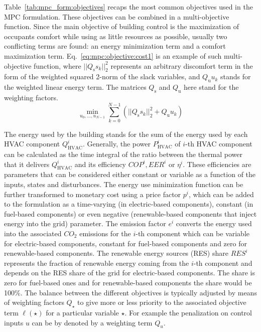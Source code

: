 \documentclass[10pt]{extarticle}
\begin{document}
Table~\ref{tab:mpc_form:objectives} recaps the most common objectives used 
in the MPC formulation. These objectives can be combined in a multi-objective function. 
% 
Since the main objective of building control is the maximization of occupants comfort while using as little resources as possible,
usually two conflicting terms are found: an energy minimization term
and a comfort maximization term.  
% 
Eq.~\eqref{eq:mpc:objective:cost1} is an example of such
 multi-objective function,
where $||{Q_{\text{s}} s_{k}}||_2^2$ represents an arbitrary discomfort term in the form of the weighted squared 2-norm of the slack variables, and ${Q_{\text{u}} u_{k}}$ stands for the weighted linear energy term. The matrices $Q_{\text{s}}$ and $Q_{\text{u}}$ here stand for the weighting factors.
\begin{equation}
\min_{u_0, \ldots, u_{N-1}}  
\sum_{k=0}^{N-1} (||{Q_{\text{s}} s_{k} }||_2^2
+ {Q_{\text{u}}  u_{k}}) \label{eq:mpc:objective:cost1}
\end{equation}
% 
 
The energy used by the building stands for the sum of the energy used by each HVAC component $Q^i_{\text{HVAC}}$.
Generally, the power $P^i_{\text{HVAC}}$ of $i$-th HVAC component can be calculated as the time integral of the
ratio between the thermal power that it delivers $Q^i_{\text{HVAC}}$ and its efficiency $COP^i, EER^i$ or $\eta^i$. 
These efficiencies are parameters that can be considered either constant or variable
as a function of the inputs, states and disturbances.
The energy use
minimization function can be further transformed to monetary cost  using a price factor  $p^i$, which can be added to the formulation 
as a time-varying (in electric-based components), constant (in fuel-based components) or even negative 
(renewable-based components that inject energy into the grid) parameter.
The emission factor $e^i$ converts the energy used into the associated $CO_2$ emissions 
for the $i$-th component which can be variable for electric-based components,
constant for fuel-based components and zero for renewable-based components.
The renewable energy sources (RES) share $RES^i$ represents the fraction of renewable
energy coming from the  $i$-th component and depends on the RES share of the grid for
electric-based components. The share is zero for fuel-based ones and for
renewable-based components the share would be 100\%.
% 
The balance between the different objectives is typically adjusted
by means of weighting factors $Q_{\star}$ to give more or less priority to the associated objective term $\ell({\star})$ for a particular variable $\star$. For example the penalization on control inputs $u$ can be by denoted by a weighting term $Q_{u}$.
\end{document}
